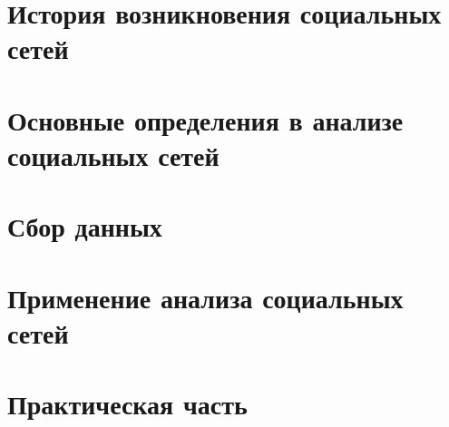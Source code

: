 \documentclass[bachelor, och, referat, times]{SCWorks}
\begin{document}


\tableofcontents






\intro


\section{История возникновения социальных сетей}


\section{Основные определения в анализе социальных сетей}


\section{Сбор данных}


\section{Применение анализа социальных сетей}


\section{Практическая часть}

\conclusion

%
\end{document}
